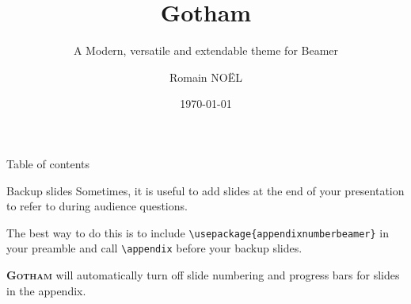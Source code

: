 \documentclass[aspectratio=43, 10pt]{beamer}
\title[]{Gotham}
\subtitle{A Modern, versatile and extendable theme for Beamer}
\date[]{\today}
\author[]{Romain NOËL}
\institute{Center for modern beamer themes}
\newcommand{\themename}{\textbf{\textsc{Gotham}}}
\begin{document}
\maketitle

	\begin{frame}[toc]{Table of contents}%
		\tableofcontents%
	\end{frame}

	







\appendix

	\begin{frame}[fragile]{Backup slides}
		Sometimes, it is useful to add slides at the end of your presentation to refer to during audience questions.

		The best way to do this is to include \verb|\usepackage{appendixnumberbeamer}| in your preamble and call \verb|\appendix| before your backup slides.

		\themename{} will automatically turn off slide numbering and progress bars for slides in the appendix.
	\end{frame}
\end{document}
